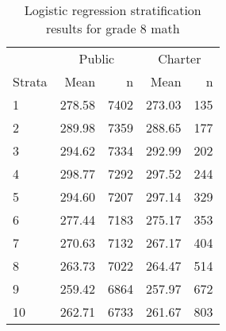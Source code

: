 \begin{table}[ht]
\centering
\caption{Logistic regression stratification results for grade 8 math} 
\label{g8math-circpsa10}
\begin{tabular}{lrr@{\extracolsep{.2cm}}rr}
  \hline
   & \multicolumn{2}{c}{Public} & \multicolumn{2}{c}{Charter} \\ \cline{2-3} \cline{4-5} Strata & Mean & n & Mean & n \\ \hline
1 & 278.58 & 7402 & 273.03 & 135 \\ 
  2 & 289.98 & 7359 & 288.65 & 177 \\ 
  3 & 294.62 & 7334 & 292.99 & 202 \\ 
  4 & 298.77 & 7292 & 297.52 & 244 \\ 
  5 & 294.60 & 7207 & 297.14 & 329 \\ 
  6 & 277.44 & 7183 & 275.17 & 353 \\ 
  7 & 270.63 & 7132 & 267.17 & 404 \\ 
  8 & 263.73 & 7022 & 264.47 & 514 \\ 
  9 & 259.42 & 6864 & 257.97 & 672 \\ 
  10 & 262.71 & 6733 & 261.67 & 803 \\ 
   \hline
\end{tabular}
\end{table}
